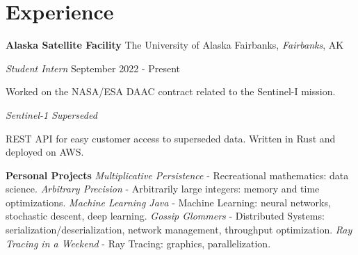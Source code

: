 ﻿\section{Experience}

\textbf{Alaska Satellite Facility}
\hfill
The University of Alaska Fairbanks, \textit{Fairbanks}, AK

\textit{Student Intern}
\hfill
{September 2022 - Present}

\bigbreak

Worked on the NASA/ESA DAAC contract related to the Sentinel-I mission.

\bigbreak

\textit{Sentinel-1 Superseded}

REST API for easy customer access to superseded data. Written in Rust and deployed on AWS.

\bigbreak
\textbf{Personal Projects}
\bigbreak
\textit{Multiplicative Persistence} - Recreational mathematics: data science.
\bigbreak
\textit{Arbitrary Precision} - Arbitrarily large integers: memory and time optimizations.
\bigbreak
\textit{Machine Learning Java} - Machine Learning: neural networks, stochastic descent, deep learning.
\bigbreak
\textit{Gossip Glommers} - Distributed Systems: serialization/deserialization, network management, throughput optimization.
\bigbreak
\textit{Ray Tracing in a Weekend} - Ray Tracing: graphics, parallelization.